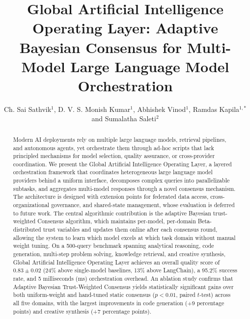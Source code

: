 \documentclass{iopjournal}
\begin{document}
{\raggedright{}\par}
\title{Global Artificial Intelligence Operating Layer: Adaptive Bayesian Consensus for Multi-Model Large Language Model Orchestration}

\author{Ch. Sai Sathvik$^1$, D. V. S. Monish Kumar$^1$, Abhishek Vinod$^1$, Ramdas Kapila$^{1,*}$ and Sumalatha Saleti$^2$}






\begin{abstract}
Modern AI deployments rely on multiple large language models, retrieval pipelines, and autonomous agents, yet orchestrate them through ad-hoc scripts that lack principled mechanisms for model selection, quality assurance, or cross-provider coordination. We present the Global Artificial Intelligence Operating Layer, a layered orchestration framework that coordinates heterogeneous large language model providers behind a uniform interface, decomposes complex queries into parallelizable subtasks, and aggregates multi-model responses through a novel consensus mechanism. The architecture is designed with extension points for federated data access, cross-organizational governance, and shared-state management, whose evaluation is deferred to future work. The central algorithmic contribution is the adaptive Bayesian trust-weighted Consensus algorithm, which maintains per-model, per-domain Beta-distributed trust variables and updates them online after each consensus round, allowing the system to learn which model excels at which task domain without manual weight tuning. On a 500-query benchmark spanning analytical reasoning, code generation, multi-step problem solving, knowledge retrieval, and creative synthesis, Global Artificial Intelligence Operating Layer achieves an overall quality score of $0.83 \pm 0.02$ (24\% above single-model baselines, 13\% above LangChain), a 95.2\% success rate, and 5 milliseconds (ms) orchestration overhead. An ablation study confirms that Adaptive Bayesian Trust-Weighted Consensus yields statistically significant gains over both uniform-weight and hand-tuned static consensus ($p < 0.01$, paired $t$-test) across all five domains, with the largest improvements in code generation (+9 percentage points) and creative synthesis (+7 percentage points).
\end{abstract}
\end{document}
